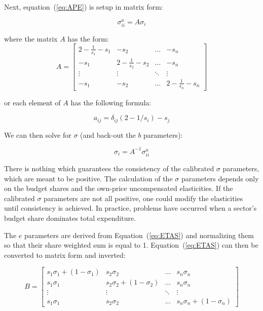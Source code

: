 Next, equation~(\ref{eq:APE}) is setup in matrix form:

\begin{equation}
\sigma_{ii}^a = A{\sigma_i}
\end{equation}

\noindent where the matrix $A$ has the form:
\begin{equation}
A = \left[
{\begin{array}{*{20}{c}}
\displaystyle  {2 - \frac {1}{{{s_1}}} - {s_1}}&{ - {s_2}}& \ldots &{ - {s_n}}\\
{ - {s_1}} & \displaystyle {2 - \frac{1}{{{s_2}}} - {s_2}}& \ldots &{ - {s_n}}\\
 \vdots & \vdots & \ddots & \vdots \\
{ - {s_1}}&{ - {s_2}}& \ldots & \displaystyle {2 - \frac{1}{{{s_n}}} - {s_n}}
\end{array}} \right]
\end{equation}

\noindent or each element of $A$ has the following formula:

\begin{displaymath}
{a_{ij}} = {\delta_{ij}}(2 - 1/{s_i}) - {s_j}
\end{displaymath}

\noindent We can then solve for $\sigma$ (and back-out the $b$ parameters):

\begin{equation}
\label{eq:SIGMACAL}
{\sigma_i} = {A^{ - 1}}\sigma_{ii}^a
\end{equation}

\noindent There is nothing which guarantees the consistency of the calibrated $\sigma$ parameters,
which are meant to be positive. The calculation of the $\sigma$ parameters depends only on the
budget shares and the own-price uncompensated elasticities. If the calibrated $\sigma$ parameters
are not all positive, one could modify the elasticities until consistency is achieved. In practice,
problems have occurred when a sector's budget share dominates total expenditure.

The $e$ parameters are derived from Equation~(\ref{eq:ETAS}) and normalizing them so that their
share weighted sum is equal to 1. Equation~(\ref{eq:ETAS}) can then be converted to matrix form
and inverted:

\begin{equation}
B = \left[ {\begin{array}{*{20}{c}}
{{s_1}{\sigma_1} + (1 - {\sigma_1})}&{{s_2}{\sigma_2}}& \ldots &{{s_n}{\sigma_n}}\\
{{s_1}{\sigma_1}}&{{s_2}{\sigma_2} + (1 - {\sigma_2})}& \ldots &{{s_n}{\sigma_n}}\\
 \vdots & \vdots & \ddots & \vdots \\
{{s_1}{\sigma_1}}&{{s_2}{\sigma_2}}& \ldots &{{s_n}{\sigma_n} + (1 - {\sigma_n})}
\end{array}} \right]
\end{equation}

